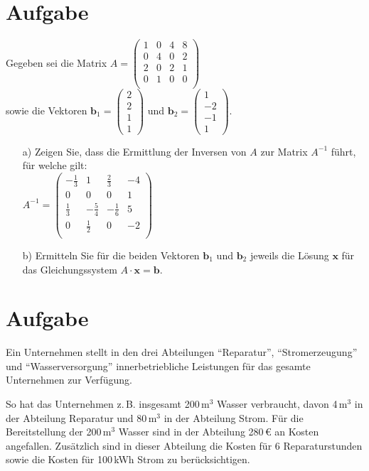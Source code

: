 \documentclass[fontsize=11pt, parskip=half]{scrartcl}
\newcommand{\four}[4]{\left(\begin{array}{c}#1\\#2\\#3\\#4\end{array}\right)}
\renewcommand{\vec}[1]{\boldsymbol #1}
\begin{document}
\section{Aufgabe}Gegeben sei die Matrix $
 A= \left( \begin{array}{cccc}  1 & 0 & 4 & 8 \\
                                0 & 4 & 0 & 2 \\
                                2 & 0 & 2 & 1 \\
                                0 & 1 & 0 & 0 \\ \end{array}\right)
$\\[0.3cm]
sowie die Vektoren $\vec{b_1}=\four{2}{2}{1}{1}$ und $\vec{b_2}=\four{1}{-2}{-1}{1}$.\\

\begin{enumerate}
\item[a)] Zeigen Sie, dass die Ermittlung der Inversen von $A$ zur Matrix $A^{-1}$ führt, für welche gilt:\\[0.3cm]
$
 A^{-1}= \left( \begin{array}{cccc}  -\frac{1}{3} & 1 & \frac{2}{3} & -4 \\[0.1cm]
                                     0 & 0 & 0 & 1 \\[0.1cm]
                                     \frac{1}{3} & -\frac{5}{4} & -\frac{1}{6} & 5 \\[0.1cm]
                                     0 & \frac{1}{2} & 0 & -2 \\ \end{array}\right)
$\\

\item[b)] Ermitteln Sie für die beiden Vektoren $\vec{b_1}$ und $\vec{b_2}$ jeweils die Lösung $\vec{x}$ für das Gleichungssystem $A \cdot \vec{x} = \vec{b}$.
\end{enumerate}


%

\section{Aufgabe}Ein Unternehmen stellt in den drei Abteilungen "`Reparatur"',
"`Stromerzeugung"' und "`Wasserversorgung"' innerbetriebliche
Leistungen für das gesamte Unternehmen zur Verfügung.

So hat das Unternehmen z.\,B. insgesamt 200\,m$^3$ Wasser
verbraucht, davon 4\,m$^3$ in der Abteilung Reparatur und 80\,m$^3$
in der Abteilung Strom. Für die Bereitstellung der 200\,m$^3$ Wasser
sind in der Abteilung 280\,€ an Kosten angefallen. Zusätzlich
sind in dieser Abteilung die Kosten für 6 Reparaturstunden sowie die
Kosten für 100\,kWh Strom zu berücksichtigen.
\end{document}

